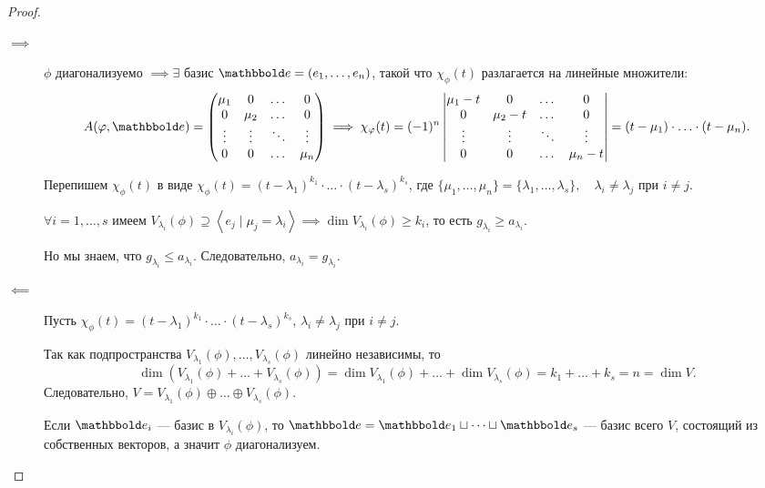 \begin{proof}~
    \begin{description}
    \item[$\implies$] $\phi$ диагонализуемо $\implies \exists$ базис $\E = (e_1, \dots, e_n)$, такой что $\chi_\phi(t)$ разлагается на линейные множители:
        \begin{equation*}
            A(\phi, \E) = \begin{pmatrix} 
                \mu_1 & 0 & \dots & 0 \\
                0 & \mu_2 & \dots & 0 \\
                \vdots & \vdots & \ddots & \vdots \\
                0 & 0 & \dots & \mu_n
            \end{pmatrix} \implies \chi_\phi(t) = (-1)^n \begin{vmatrix} 
                \mu_1 - t & 0 & \dots & 0 \\
                0 & \mu_2 - t & \dots & 0 \\
                \vdots & \vdots & \ddots & \vdots \\
                0 & 0 & \dots & \mu_n - t
            \end{vmatrix} = (t - \mu_1) \cdot \ldots \cdot (t - \mu_n)
        .\end{equation*}

        Перепишем $\chi_\phi(t)$ в виде $\chi_\phi(t) = (t - \lambda_1)^{k_1} \cdot \ldots \cdot (t - \lambda_s)^{k_s}$, где $ \{\mu_1, \dots, \mu_n\} = \{\lambda_1, \dots, \lambda_s\}, \quad \lambda_i \neq \lambda_j$ при $i \neq j$.

        $\forall i = 1, \dots, s$ имеем $V_{\lambda_i}(\phi) \supseteq \left< e_j \mid \mu_j = \lambda_i \right> \implies \dim V_{\lambda_i}(\phi) \geq k_i$, то есть $g_{\lambda_i} \geq a_{\lambda_i}$.

        Но мы знаем, что $g_{\lambda_i} \leq a_{\lambda_i}$. Следовательно, $a_{\lambda_i} = g_{\lambda_i}$.

    \item[$\impliedby$] Пусть $\chi_\phi(t) = (t - \lambda_1)^{k_1} \cdot \ldots \cdot (t - \lambda_s)^{k_s}$, $\lambda_i \neq \lambda_j$ при $i \neq j$.

        Так как подпространства $V_{\lambda_1}(\phi), \dots, V_{\lambda_s}(\phi)$ линейно независимы, то 
        \begin{equation*}
            \dim(V_{\lambda_1}(\phi) + \dots + V_{\lambda_s}(\phi)) = \dim V_{\lambda_1}(\phi) + \dots + \dim V_{\lambda_s}(\phi) = k_1 + \dots + k_s = n = \dim V
        .\end{equation*}
        Следовательно, $V = V_{\lambda_1}(\phi) \oplus \dots \oplus V_{\lambda_s}(\phi)$.

        Если $\E_i$ --- базис в $V_{\lambda_i}(\phi)$, то $\E = \E_1 \sqcup \dots \sqcup \E_s$ --- базис всего $V$, состоящий из собственных векторов, а значит $\phi$ диагонализуем.
        \qedhere
    \end{description}
\end{proof}

